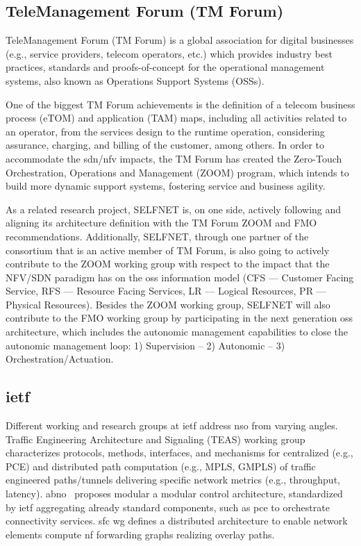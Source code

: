 \subsection{TeleManagement Forum (TM Forum)}
TeleManagement Forum (TM Forum) is a global association for
digital businesses (e.g., service providers, telecom operators, etc.) which provides industry best practices, standards and proofs-of-concept for the operational management systems, also known as Operations Support Systems (OSSs). 

One of the biggest TM Forum achievements is the definition of a telecom business process (eTOM) and application (TAM) maps, including all activities related to an operator, from the services design to the runtime operation, considering assurance, charging, and billing of the customer, among others. In order to accommodate the \gls{sdn}/\gls{nfv} impacts, the TM Forum has created the Zero-Touch Orchestration, Operations and Management (ZOOM) program, which intends to build more dynamic support systems, fostering service and business agility.

As a related research project, SELFNET is, on one side, actively following and aligning its architecture definition with the TM Forum ZOOM and FMO recommendations. Additionally, SELFNET, through one partner of the consortium that is an active member of TM Forum, is also going to actively contribute to the ZOOM working group with respect to the impact that the NFV/SDN paradigm has on the \gls{oss} information model (CFS --– Customer Facing Service, RFS --– Resource Facing Services, LR --– Logical Resources, PR --– Physical Resources). Besides the ZOOM working group, SELFNET will also contribute to the FMO working group by participating in the next generation \gls{oss} architecture, which includes the autonomic management capabilities to close the autonomic management loop: 1) Supervision – 2) Autonomic – 3) Orchestration/Actuation.

\subsection{\acrfull{ietf}}
Different working and research groups at \gls{ietf} address \gls{nso} from varying angles. Traffic Engineering Architecture and Signaling (TEAS) working group characterizes protocols, methods, interfaces, and mechanisms for centralized (e.g., PCE) and distributed path computation (e.g., MPLS, GMPLS) of traffic engineered paths/tunnels delivering specific network metrics (e.g., throughput, latency).  
\gls{abno}~\cite{RFC7491} proposes modular a modular control architecture, standardized by \gls{ietf} aggregating already standard components, such as \gls{pce} to orchestrate connectivity services.  
\gls{sfc} \gls{wg} defines a distributed architecture to enable network elements compute \gls{nf} forwarding graphs realizing overlay paths.
 
